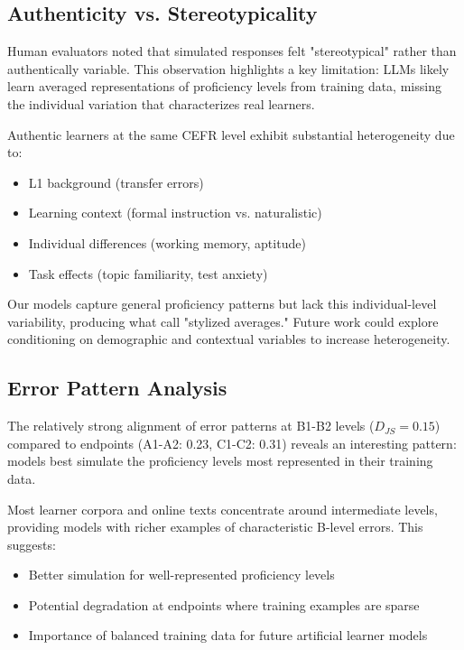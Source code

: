 \subsection{Authenticity vs. Stereotypicality}

Human evaluators noted that simulated responses felt "stereotypical" rather than authentically variable. This observation highlights a key limitation: LLMs likely learn averaged representations of proficiency levels from training data, missing the individual variation that characterizes real learners.

Authentic learners at the same CEFR level exhibit substantial heterogeneity due to:
\begin{itemize}
    \item L1 background (transfer errors)
    \item Learning context (formal instruction vs. naturalistic)
    \item Individual differences (working memory, aptitude)
    \item Task effects (topic familiarity, test anxiety)
\end{itemize}

Our models capture general proficiency patterns but lack this individual-level variability, producing what \citet{xia2024second} call "stylized averages." Future work could explore conditioning on demographic and contextual variables to increase heterogeneity.

\subsection{Error Pattern Analysis}

The relatively strong alignment of error patterns at B1-B2 levels ($D_{JS} = 0.15$) compared to endpoints (A1-A2: 0.23, C1-C2: 0.31) reveals an interesting pattern: models best simulate the proficiency levels most represented in their training data.

Most learner corpora and online texts concentrate around intermediate levels, providing models with richer examples of characteristic B-level errors. This suggests:
\begin{itemize}
    \item Better simulation for well-represented proficiency levels
    \item Potential degradation at endpoints where training examples are sparse
    \item Importance of balanced training data for future artificial learner models
\end{itemize}

